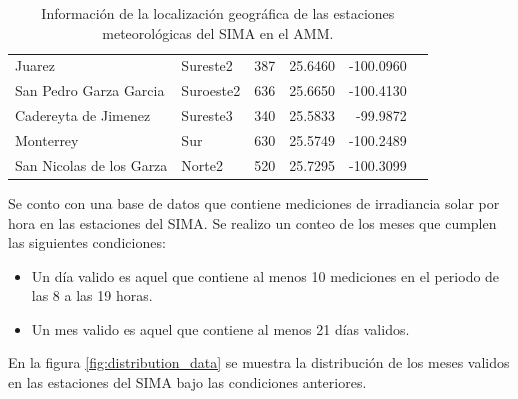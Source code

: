 \begin{table}[H]
\begin{tabular}{llcrrr}
		Juarez                   & Sureste2        & 387                                                                                                                        & 25.6460               & -100.0960              \\
		San Pedro Garza Garcia   & Suroeste2       & 636                                                                                                                        & 25.6650               & -100.4130              \\
		Cadereyta de Jimenez     & Sureste3        & 340                                                                                                                        & 25.5833               & -99.9872               \\
		Monterrey                & Sur             & 630                                                                                                                        & 25.5749               & -100.2489              \\
		San Nicolas de los Garza & Norte2          & 520                                                                                                                        & 25.7295               & -100.3099              \\ \hline
	\end{tabular}
	\caption{Información de la localización geográfica de las estaciones meteorológicas del SIMA en el AMM.}
	\label{table:stations_information}
\end{table}

Se conto con una base de datos que contiene mediciones de irradiancia solar por hora en las estaciones del SIMA. Se realizo un conteo de los meses que cumplen las siguientes condiciones:

\begin{itemize}
	\item Un día valido es aquel que contiene al menos 10 mediciones en el periodo de las 8 a las 19 horas.
	\item Un mes valido es aquel que contiene al menos 21 días validos.
\end{itemize}

En la figura \ref{fig:distribution_data} se muestra la distribución de los meses validos en las estaciones del SIMA bajo las condiciones anteriores.

